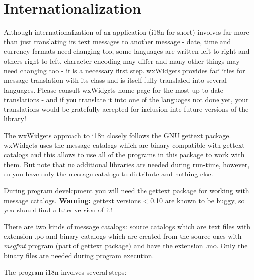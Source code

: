 \section{Internationalization}\label{internationalization}

Although internationalization of an application (i18n for short) involves far
more than just translating its text messages to another message - date, time and
currency formats need changing too, some languages are written left to right
and others right to left, character encoding may differ and many other things
may need changing too - it is a necessary first step. wxWidgets provides
facilities for message translation with its 
 class and is itself fully translated into several
languages. Please consult wxWidgets home page for the most up-to-date
translations - and if you translate it into one of the languages not done
yet, your translations would be gratefully accepted for inclusion into future
versions of the library!

The wxWidgets approach to i18n closely follows the GNU gettext package. wxWidgets uses the
message catalogs which are binary compatible with gettext catalogs and this
allows to use all of the programs in this package to work with them. But note
that no additional libraries are needed during run-time, however, so you
have only the message catalogs to distribute and nothing else.

During program development you will need the gettext package for
working with message catalogs. {\bf Warning:} gettext versions < 0.10 are known
to be buggy, so you should find a later version of it!

There are two kinds of message catalogs: source catalogs which are text files
with extension .po and binary catalogs which are created from the source ones
with {\it msgfmt} program (part of gettext package) and have the extension .mo.
Only the binary files are needed during program execution.

The program i18n involves several steps:

